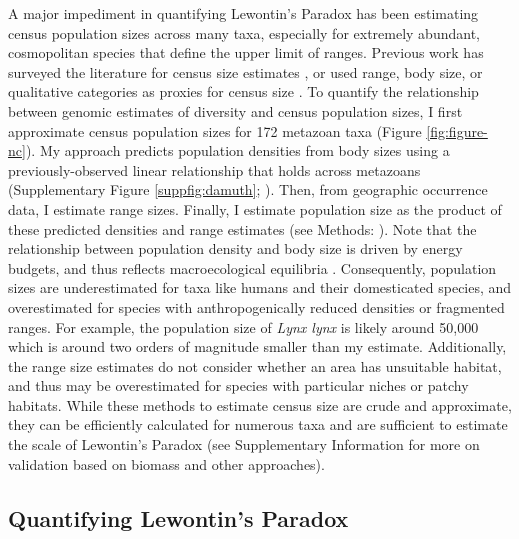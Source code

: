 \documentclass[11pt]{article}
\newcommand{\Newnameref}[1]{\textit{\nameref{#1}}}
\begin{document}
A major impediment in quantifying Lewontin's Paradox has been estimating census
population sizes across many taxa, especially for extremely abundant,
cosmopolitan species that define the upper limit of ranges. Previous work has
surveyed the literature for census size estimates
\parencite{Nei1984-zi,Soule1976-he,Frankham1996-yb}, or used range, body size,
or qualitative categories as proxies for census size
\parencite{Corbett-Detig2015-gt,Leffler2012-zj}. To quantify the relationship
between genomic estimates of diversity and census population sizes, I first
approximate census population sizes for 172 metazoan taxa (Figure
\ref{fig:figure-nc}). My approach predicts population densities from body sizes
using a previously-observed linear relationship that holds across metazoans
(Supplementary Figure \ref{suppfig:damuth};
\cite{Damuth1981-st,Damuth1987-sg}). Then, from geographic occurrence data, I
estimate range sizes.  Finally, I estimate population size as the product of
these predicted densities and range estimates (see Methods:
\Newnameref{sec:methods-popsize}). Note that the relationship between
population density and body size is driven by energy budgets, and thus reflects
macroecological equilibria \parencite{Damuth1987-sg}. Consequently, population
sizes are underestimated for taxa like humans and their domesticated species,
and overestimated for species with anthropogenically reduced densities or
fragmented ranges. For example, the population size of \emph{Lynx lynx} is
likely around 50,000 \parencite{Iucn2020-ap} which is around two orders of
magnitude smaller than my estimate. Additionally, the range size estimates do
not consider whether an area has unsuitable habitat, and thus may be
overestimated for species with particular niches or patchy habitats. While
these methods to estimate census size are crude and approximate, they can be
efficiently calculated for numerous taxa and are sufficient to estimate the
scale of Lewontin's Paradox (see Supplementary Information
\Newnameref{supp:popsize-valid} for more on validation based on biomass and
other approaches). 

\subsection*{Quantifying Lewontin's Paradox}
\end{document}
